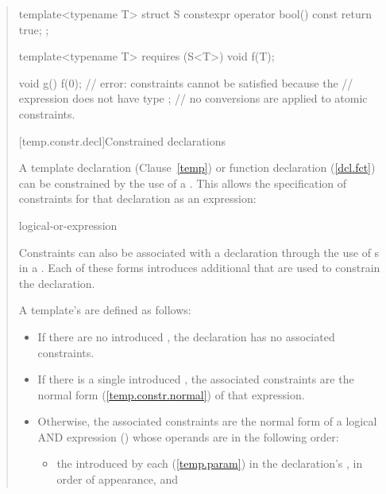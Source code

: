 \begin{quote}
\begin{addedblock}
\begin{codeblock}
template<typename T>
  struct S {
    constexpr operator bool() const { return true; }
  };

template<typename T>
  requires (S<T>{})
    void f(T);

void g() {
  f(0); // error: constraints cannot be satisfied because the
        // expression  does not have type ;
        // no conversions are applied to atomic constraints.
}
\end{codeblock}
\exitexample


[temp.constr.decl]{Constrained declarations}

\pnum
A template declaration (Clause~\ref{temp}) or function declaration 
(\ref{dcl.fct}) can be constrained by the use of a 
. 
% 
This allows the specification of constraints for that declaration as
an expression:

\begin{bnf}
\br
    logical-or-expression
\end{bnf}

\pnum
Constraints can also be associated with a declaration through the use of 
s in a 
.
% 
Each of these forms introduces additional  
that are used to constrain the declaration.

\pnum
A template's  are defined as follows:
%
\begin{itemize}
\item If there are no introduced ,
the declaration has no associated constraints.

\item If there is a single introduced ,
the associated constraints are the normal form (\ref{temp.constr.normal})
of that expression.

\item Otherwise, the associated constraints are the normal form of a logical 
AND expression () whose operands are in the 
following order:
% 
\begin{itemize}
\item the  introduced by each
       (\ref{temp.param}) in the 
      declaration's , in
      order of appearance, and


\end{itemize}
\end{itemize}
\end{addedblock}
\end{quote}
